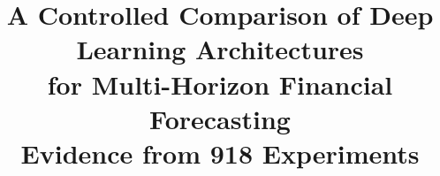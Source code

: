 \documentclass[12pt, a4paper]{article}
\begin{document}
\title{%
  {\sffamily\bfseries\LARGE A Controlled Comparison of Deep Learning Architectures\\[3pt]
  for Multi-Horizon Financial Forecasting}\\[8pt]
  {\sffamily\large Evidence from 918 Experiments}%
}

\author{%
}

\date{}
\maketitle
\thispagestyle{plain}

\end{document}
